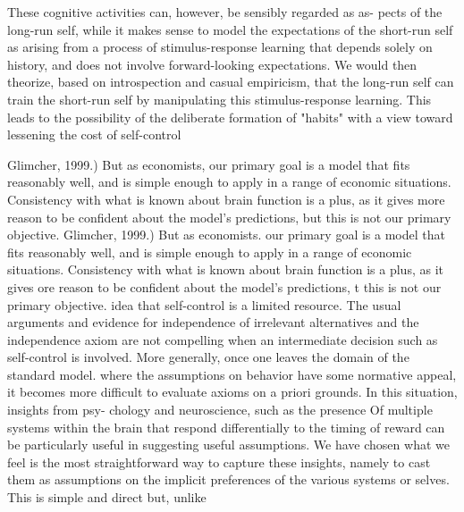 \documentclass{article}
\begin{document}
These cognitive activities can, however, be sensibly regarded as as- 
pects of the long-run self, while it makes sense to model the expectations of the short-run self as arising from a process of stimulus-response 
learning that depends solely on history, and does not involve forward-looking expectations. 
We would then theorize, based on introspection 
and casual empiricism, that the long-run self can train the short-run self by manipulating this 
stimulus-response learning. This leads to the 
possibility of the deliberate formation of "habits" with a view toward lessening the cost of self-control



Glimcher, 1999.) But as economists, our primary goal is a model that fits reasonably well, and is simple enough to
apply in a range of economic situations. Consistency with
what is known about brain function is a plus, as it gives more reason to be confident about the model's predictions,
but this is not our primary objective.
Glimcher, 1999.) But as economists. our primary goal is a model that fits reasonably well, and is simple enough to
apply in a range of economic situations. Consistency with
what is known about brain function is a plus, as it gives
ore reason to be confident about the model's predictions,
t this is not our primary objective.
idea that self-control is a limited resource. The usual arguments and evidence for independence
of irrelevant alternatives and the independence axiom are not compelling when an intermediate
decision such as self-control is involved. More generally, once one leaves the domain of the
standard model. where the assumptions on behavior have some normative appeal, it becomes more difficult to evaluate axioms on a priori grounds. In this situation, insights from psy-
chology and neuroscience, such as the presence Of multiple systems within the brain that respond differentially to the timing of reward can be particularly useful in suggesting useful
assumptions. We have chosen what we feel is the most straightforward way to capture these insights, namely to cast them as assumptions on the implicit preferences of the various systems
or selves. This is simple and direct but, unlike
                
\end{document}

